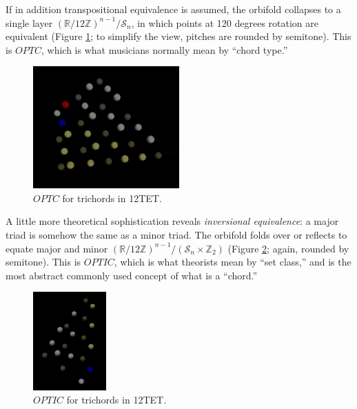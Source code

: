\documentclass[english,11pt,letterpaper,onecolumn]{scrartcl}
\numberwithin{equation}{section}
\begin{document}
    If in addition transpositional equivalence is assumed, the orbifold 
collapses 
    to a single layer 
$\left(\mathbb{R}/12\mathbb{Z}\right)^{n-1}/\mathcal{S}_{n}$, 
    in which points at 120 degrees rotation are equivalent (Figure 
\ref{fig:opttc}; 
    to simplify the view, pitches are rounded by semitone). This is $OPTC$, 
which 
    is what musicians normally mean by ``chord type.''
    
    \begin{figure}
        \centerline{\includegraphics[width = 0.5\textwidth]{opttc}}
        \caption{\label{fig:opttc} 
            $OPTC$ for trichords in 12TET.}
    \end{figure}
    
    A little more theoretical sophistication reveals \textit{inversional 
        equivalence}: a major triad is somehow the same as a minor triad. The 
    orbifold folds over or reflects to equate major and minor 
    $\left(\mathbb{R}/12\mathbb{Z}\right)^{n-1}/(\mathcal{S}_{n} \times 
    \mathbb{Z}_{2})$ (Figure \ref{fig:optic}; again, rounded by semitone). This 
is 
    $OPTIC$, which is what theorists mean by ``set class,'' and is the most 
    abstract commonly used concept of what is a ``chord.''
    
    \begin{figure}
        \centerline{\includegraphics[width = 0.25\textwidth]{opttic}}
        \caption{\label{fig:optic} 
            $OPTIC$ for trichords in 12TET.}
    \end{figure}
    
\end{document}
